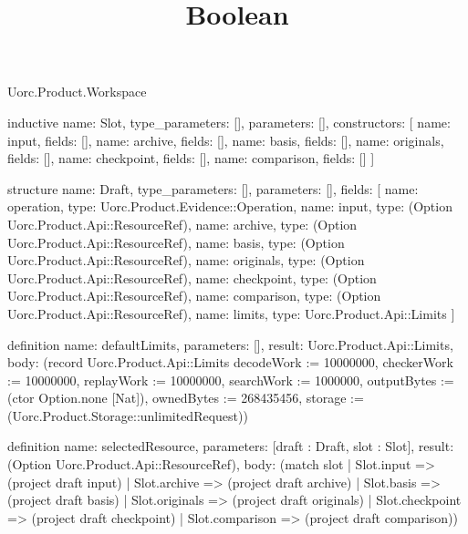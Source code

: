 \begin{lexlean}{Uorc.Product.Workspace}
\title{Boolean}
\begin{semanticmodule}
inductive{
  name: Slot,
  type_parameters: [],
  parameters: [],
  constructors: [
    {name: input, fields: []},
    {name: archive, fields: []},
    {name: basis, fields: []},
    {name: originals, fields: []},
    {name: checkpoint, fields: []},
    {name: comparison, fields: []}
  ]
}

structure{
  name: Draft,
  type_parameters: [],
  parameters: [],
  fields: [
    {name: operation, type: Uorc.Product.Evidence::Operation},
    {name: input, type: (Option Uorc.Product.Api::ResourceRef)},
    {name: archive, type: (Option Uorc.Product.Api::ResourceRef)},
    {name: basis, type: (Option Uorc.Product.Api::ResourceRef)},
    {name: originals, type: (Option Uorc.Product.Api::ResourceRef)},
    {name: checkpoint, type: (Option Uorc.Product.Api::ResourceRef)},
    {name: comparison, type: (Option Uorc.Product.Api::ResourceRef)},
    {name: limits, type: Uorc.Product.Api::Limits}
  ]
}

definition{
  name: defaultLimits,
  parameters: [],
  result: Uorc.Product.Api::Limits,
  body: (record Uorc.Product.Api::Limits {decodeWork := 10000000, checkerWork := 10000000, replayWork := 10000000, searchWork := 1000000, outputBytes := (ctor Option.none [Nat]), ownedBytes := 268435456, storage := (Uorc.Product.Storage::unlimitedRequest)})
}

definition{
  name: selectedResource,
  parameters: [draft : Draft, slot : Slot],
  result: (Option Uorc.Product.Api::ResourceRef),
  body: (match slot
    | Slot.input => (project draft input)
    | Slot.archive => (project draft archive)
    | Slot.basis => (project draft basis)
    | Slot.originals => (project draft originals)
    | Slot.checkpoint => (project draft checkpoint)
    | Slot.comparison => (project draft comparison))
}


\end{semanticmodule}
\end{lexlean}
